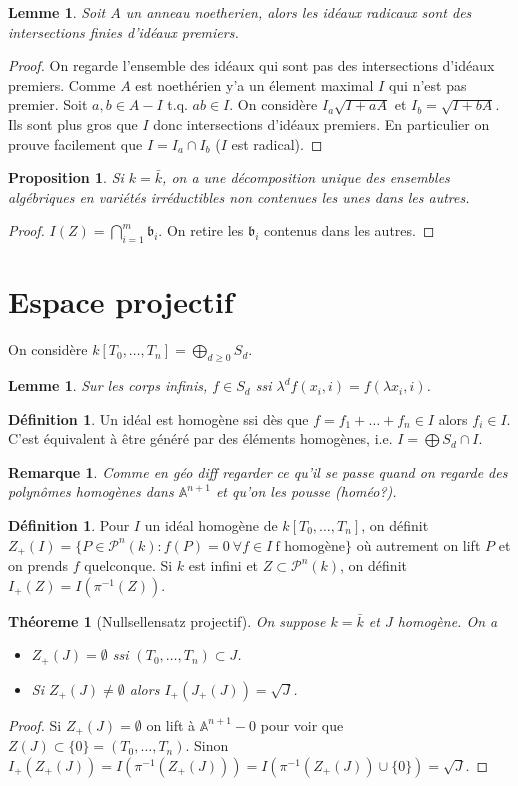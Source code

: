 \documentclass[a4paper,12pt]{book}
\newcommand{\A}{\mathbb{A}}
\renewcommand{\P}{\mathscr{P}}
\theoremstyle{plain}
\newtheorem{thm}[subsection]{Théoreme}
\newtheorem{lem}[subsection]{Lemme}
\newtheorem{prop}[subsection]{Proposition}
\newtheorem{rem}{Remarque}
\theoremstyle{definition}
\newtheorem{defn}[subsection]{Définition}
\theoremstyle{remark}
\begin{document}
\begin{lem}
    Soit $A$ un anneau noetherien, alors les idéaux radicaux sont 
    des intersections finies d'idéaux premiers.
\end{lem}
\begin{proof}
    On regarde l'ensemble des idéaux qui sont pas des intersections
    d'idéaux premiers. Comme $A$ est noethérien y'a un élement maximal
    $I$ qui n'est pas premier. Soit $a,b\in A-I$ t.q. $ab\in I$. On 
    considère $I_a\sqrt{I+aA}$ et $I_b=\sqrt{I+bA}$. Ils sont plus gros 
    que $I$ donc intersections d'idéaux premiers. En particulier
    on prouve facilement que $I=I_a\cap I_b$ ($I$ est radical).
\end{proof}
\begin{prop}
    Si $k=\bar k$, on a une décomposition unique des ensembles 
    algébriques en variétés irréductibles non contenues les unes dans 
    les autres.
\end{prop}
\begin{proof}
    $I(Z)=\bigcap_{i=1}^m \mathfrak b_i$. On retire les $\mathfrak b_i$
    contenus dans les autres.
\end{proof}
\section{Espace projectif}
On considère $k[T_0,\ldots, T_n]=\bigoplus_{d\geq 0} S_d$. 
\begin{lem}
    Sur les corps infinis, $f\in S_d$ ssi 
    $\lambda^df(x_i,i)=f(\lambda x_i,i)$.
\end{lem}
\begin{defn}
    Un idéal est homogène ssi dès que $f=f_1+\ldots+f_n\in I$ alors
    $f_i\in I$. C'est équivalent à être généré par des éléments 
    homogènes, i.e. $I=\bigoplus S_d\cap I$.
\end{defn}
\begin{rem}
    Comme en géo diff regarder ce qu'il se passe quand on regarde des 
    polynômes homogènes dans $\A^{n+1}$ et qu'on les pousse (homéo?).
\end{rem}
\begin{defn}
    Pour $I$ un idéal homogène de $k[T_0,\ldots, T_n]$, on définit 
    $Z_+(I)=\{P\in \P^n(k) : f(P)=0~\forall f\in I~\textrm{f homogène}\}$
    où autrement on lift $P$ et on prends $f$ quelconque. Si $k$ est
    infini et $Z\subset \P^n(k)$, on définit $I_+(Z)=I(\pi^{-1}(Z))$.
\end{defn}

\begin{thm}[Nullsellensatz projectif]
    On suppose $k=\bar k$ et $J$ homogène. On a 
    \begin{itemize}
	\item $Z_+(J)=\emptyset $ ssi $(T_0,\ldots,T_n)\subset J$.
	\item Si $Z_+(J)\ne \emptyset$ alors $I_+(J_+(J))=\sqrt J$.
    \end{itemize}
\end{thm}
\begin{proof}
    Si $Z_+(J)=\emptyset$ on lift à $\A^{n+1}-0$ pour voir que 
    $Z(J)\subset \{0\}=(T_0,\ldots, T_n)$. Sinon $I_+(Z_+(J))=I(\pi^{-1}
    (Z_+(J)))=I(\pi^{-1}(Z_+(J))\cup\{0\})=\sqrt J$.
\end{proof}
\end{document}
